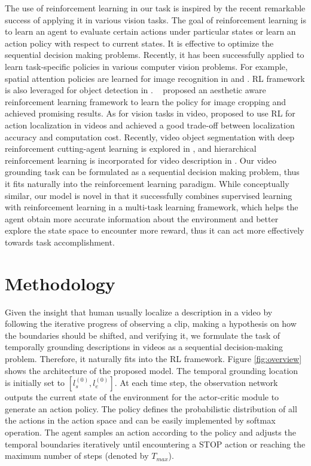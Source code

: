 \documentclass[letterpaper]{article} %
\begin{document}
The use of reinforcement learning \cite{williams1992simple} in our task is inspired by the recent remarkable success of applying it in various vision tasks. The goal of reinforcement learning is to learn an agent to evaluate certain actions under particular states or learn an action policy with respect to current states. It is effective to optimize the sequential decision making problems. Recently, it has been successfully applied to learn task-specific policies in various computer vision problems. For example, spatial attention policies are learned for image recognition in \cite{mnih2014recurrent} and \cite{liu2017localizing}. RL framework is also leveraged for object detection in \cite{Pirinen_2018_CVPR}. \citeauthor{Li_2018_CVPR}~ proposed an aesthetic aware reinforcement learning framework to learn the policy for image cropping and achieved promising results. As for vision tasks in video, \cite{lifeifei_loc} proposed to use  RL for action localization in videos and achieved a good trade-off between localization accuracy and computation cost. Recently, video object segmentation with deep reinforcement cutting-agent learning is explored in \cite{han2018reinforcement}, and hierarchical reinforcement learning \cite{li2017deep} is incorporated for video description in \cite{Wang_2018_CVPR}. Our video grounding task can be formulated as a sequential decision making problem, thus it fits naturally into the reinforcement learning paradigm. While conceptually similar, our model is novel in that it successfully combines supervised learning with reinforcement learning in a multi-task learning framework, which helps the agent obtain more accurate information about the environment and better explore the state space to encounter more reward, thus it can act more effectively towards task accomplishment.

\section{Methodology}
Given the insight that human usually localize a description in a video by following the iterative progress of observing a clip, making a hypothesis on how the boundaries should be shifted, and verifying it, we formulate the task of  temporally grounding descriptions in videos as a sequential decision-making problem. Therefore, it naturally fits into the RL framework. Figure \ref{fig:overview} shows the architecture of the proposed model.
The temporal grounding location is initially set to $[l_s^{(0)}, l_e^{(0)}]$. At each time step, the observation network outputs the current state of the environment for the actor-critic module to generate an action policy. The policy defines the probabilistic distribution of all the actions in the action space and can be easily implemented by softmax operation. The agent samples an action according to the policy and adjusts the temporal boundaries iteratively until encountering a STOP action or reaching the maximum number of steps (denoted by $T_{max}$).
\end{document}
